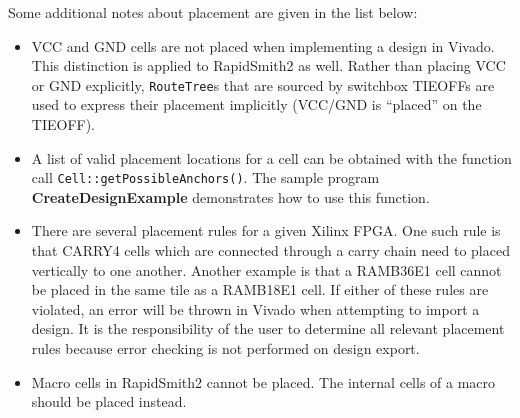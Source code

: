 \vspace{.2cm}
\noindent
Some additional notes about placement are given in the list below: 

\begin {itemize}
  \item VCC and GND cells are not placed when implementing a design in Vivado.
  This distinction is applied to RapidSmith2 as well. Rather than placing VCC
  or GND explicitly, \texttt{RouteTree}s that are sourced by switchbox TIEOFFs
  are used to express their placement implicitly (VCC/GND is ``placed'' on the
  TIEOFF).
  
  \item A list of valid placement locations for a cell can be obtained with the
  function call \texttt{Cell::get\-Possible\-Anchors()}. The sample program
  \textbf{CreateDesignExample} demonstrates how to use this function.
 
  \item There are several placement rules for a given Xilinx FPGA. One such
  rule is that CARRY4 cells which are connected through a carry chain need
  to placed vertically to one another. Another example is that a RAMB36E1
  cell cannot be placed in the same tile as a RAMB18E1 cell. If either of these
  rules are violated, an error will be thrown in Vivado when attempting to
  import a design. It is the responsibility of the user to determine all
  relevant placement rules because error checking is not performed on design
  export.
  
  \item Macro cells in RapidSmith2 cannot be placed. The internal cells of a
  macro should be placed instead.
\end{itemize}
